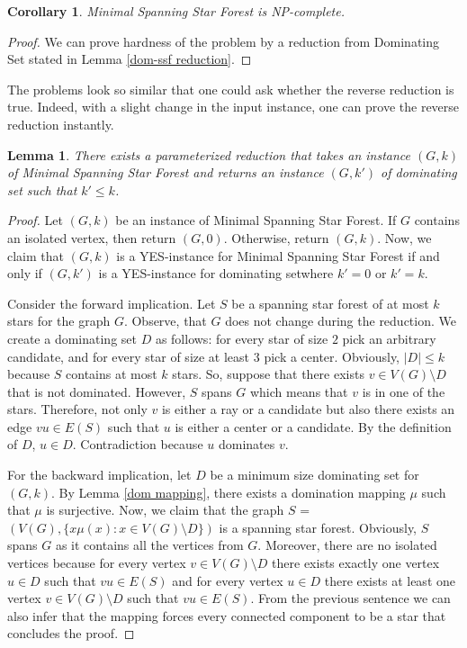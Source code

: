 \documentclass[en]{pracamgr}
\newtheorem{lemma}{Lemma}
\newtheorem{corollary}{Corollary}
\newcommand{\mssfp}{{\sc Minimal Spanning Star Forest}}
\newcommand{\domset}{dominating set}
\newcommand{\domsetp}{{\sc Dominating Set}}
\begin{document}
\begin{corollary}
	\mssfp{} is NP-complete.
\end{corollary}

\begin{proof}
	We can prove hardness of the problem by a reduction from \domsetp{} stated in Lemma \ref{dom-ssf reduction}.
\end{proof}

The problems look so similar that one could ask whether the reverse reduction is true. Indeed, with a slight change in the input instance, one can prove the reverse reduction instantly.

\begin{lemma}\label{ssf-dom reduction}
	There exists a parameterized reduction that takes an instance $(G,k)$ of \mssfp{} and returns an instance $(G,k')$ of \domset{} such that $k' \leq k$. 
\end{lemma}

\begin{proof}
	Let $(G,k)$ be an instance of \mssfp{}. If $G$ contains an isolated vertex, then return $(G,0)$. Otherwise, return $(G,k)$. Now, we claim that $(G,k)$ is a YES-instance for \mssfp{} if and only if $(G,k')$ is a YES-instance for \domset where $k'=0$ or $k'=k$.
	
	Consider the forward implication. Let $S$ be a spanning star forest of at most $k$ stars for the graph $G$. Observe, that $G$ does not change during the reduction. We create a dominating set $D$ as follows: for every star of size $2$ pick an arbitrary candidate, and for every star of size at least $3$ pick a center. Obviously, $|D| \leq k$ because $S$ contains at most $k$ stars. So, suppose that there exists $v \in V(G) \setminus D$ that is not dominated. However, $S$ spans $G$ which means that $v$ is in one of the stars. Therefore, not only $v$ is either a ray or a candidate but also there exists an edge $vu \in E(S)$ such that $u$ is either a center or a candidate. By the definition of $D$, $u \in D$. Contradiction because $u$ dominates $v$.
	
	For the backward implication, let $D$ be a minimum size dominating set for $(G,k)$. By Lemma \ref{dom mapping}, there exists a domination mapping $\mu$ such that $\mu$ is surjective. Now, we claim that the graph $S$ = $(V(G), \{x\mu(x): x \in V(G) \setminus D\})$ is a spanning star forest. Obviously, $S$ spans $G$ as it contains all the vertices from $G$. Moreover, there are no isolated vertices because for every vertex $v \in V(G) \setminus D$ there exists exactly one vertex $u \in D$ such that $vu \in E(S)$ and for every vertex $u \in D$ there exists at least one vertex $v \in V(G) \setminus D$ such that $vu \in E(S)$. From the previous sentence we can also infer that the mapping forces every connected component to be a star that concludes the proof.
\end{proof}
\end{document}
